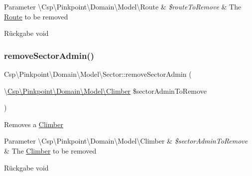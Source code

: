 \begin{DoxyParams}[1]{Parameter}
\textbackslash{}\+Csp\textbackslash{}\+Pinkpoint\textbackslash{}\+Domain\textbackslash{}\+Model\textbackslash{}\+Route & {\em \$route\+To\+Remove} & The \hyperlink{classCsp_1_1Pinkpoint_1_1Domain_1_1Model_1_1Route}{Route} to be removed \\
\hline
\end{DoxyParams}
\begin{DoxyReturn}{Rückgabe}
void 
\end{DoxyReturn}
\mbox{\label{classCsp_1_1Pinkpoint_1_1Domain_1_1Model_1_1Sector_ad65ca58d005f3cd5806022d8d4fd928f}} 
\subsubsection{\texorpdfstring{remove\+Sector\+Admin()}{removeSectorAdmin()}}
{\footnotesize\ttfamily Csp\textbackslash{}\+Pinkpoint\textbackslash{}\+Domain\textbackslash{}\+Model\textbackslash{}\+Sector\+::remove\+Sector\+Admin (\begin{DoxyParamCaption}\item[{\textbackslash{}\hyperlink{classCsp_1_1Pinkpoint_1_1Domain_1_1Model_1_1Climber}{Csp\textbackslash{}\+Pinkpoint\textbackslash{}\+Domain\textbackslash{}\+Model\textbackslash{}\+Climber}}]{\$sector\+Admin\+To\+Remove }\end{DoxyParamCaption})}

Removes a \hyperlink{classCsp_1_1Pinkpoint_1_1Domain_1_1Model_1_1Climber}{Climber}


\begin{DoxyParams}[1]{Parameter}
\textbackslash{}\+Csp\textbackslash{}\+Pinkpoint\textbackslash{}\+Domain\textbackslash{}\+Model\textbackslash{}\+Climber & {\em \$sector\+Admin\+To\+Remove} & The \hyperlink{classCsp_1_1Pinkpoint_1_1Domain_1_1Model_1_1Climber}{Climber} to be removed \\
\hline
\end{DoxyParams}
\begin{DoxyReturn}{Rückgabe}
void 
\end{DoxyReturn}
\mbox{\label{classCsp_1_1Pinkpoint_1_1Domain_1_1Model_1_1Sector_ad1667356abec39da2b4931f168b727dd}} 
